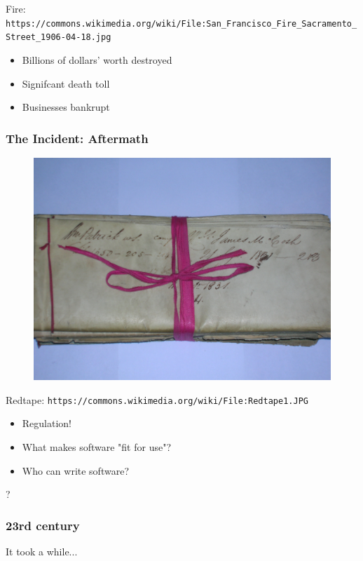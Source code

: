 Fire: \verb|https://commons.wikimedia.org/wiki/File:San_Francisco_Fire_Sacramento_Street_1906-04-18.jpg|

\begin{itemize}
\item Billions of dollars' worth destroyed
\item Signifcant death toll
\item Businesses bankrupt
\end{itemize}

\begin{frame}[fragile]
\frametitle{The Incident: Aftermath}

\begin{figure}
\includegraphics[scale=0.5]{redtape}
\end{figure}

\end{frame}

Redtape: \verb|https://commons.wikimedia.org/wiki/File:Redtape1.JPG|

\begin{itemize}
\item Regulation!
\item What makes software "fit for use"?
\item Who can write software?
\end{itemize}?

\begin{frame}[fragile]
\frametitle{23rd century}

It took a while...

\end{frame}

